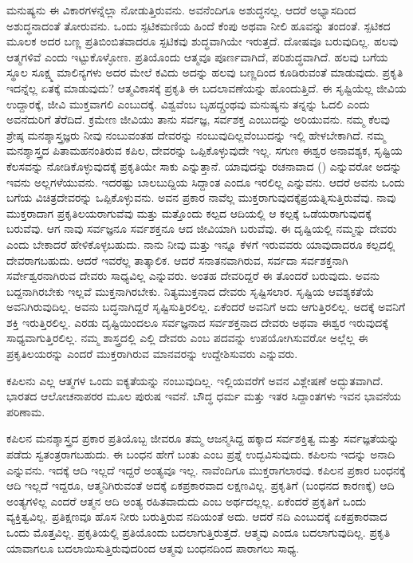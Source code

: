 ಮನುಷ್ಯನು ಈ ವಿಕಾರಗಳನ್ನೆಲ್ಲಾ ನೋಡುತ್ತಿರುವನು. ಅವನೆಂದಿಗೂ ಅಶುದ್ಧನಲ್ಲ. ಆದರೆ ಅಭ್ಯಾಸದಿಂದ ಅಶುದ್ಧನಾದಂತೆ ತೋರುವನು. ಒಂದು ಸ್ಪಟಿಕಮಣಿಯ ಹಿಂದೆ ಕೆಂಪು ಅಥವಾ ನೀಲಿ ಹೂವನ್ನು ತಂದಂತೆ. ಸ್ಪಟಿಕದ ಮೂಲಕ ಅದರ ಬಣ್ಣ ಪ್ರತಿಬಿಂಬಿತವಾದರೂ ಸ್ಪಟಿಕವು ಶುದ್ಧವಾಗಿಯೇ ಇರುತ್ತದೆ. ದೋಷವೂ ಬರುವುದಿಲ್ಲ. ಹಲವು ಆತ್ಮಗಳಿವೆ ಎಂದು ಇಟ್ಟುಕೊಳ್ಳೋಣ. ಪ್ರತಿಯೊಂದು ಆತ್ಮವೂ ಪೂರ್ಣವಾಗಿದೆ, ಪರಿಶುದ್ಧವಾಗಿದೆ. ಹಲವು ಬಗೆಯ ಸ್ಥೂಲ ಸೂಕ್ಷ್ಮ ಮಾಲಿನ್ಯಗಳು ಅದರ ಮೇಲೆ ಕವಿದು ಅದನ್ನು ಹಲವು ಬಣ್ಣದಿಂದ ಕೂಡಿರುವಂತೆ ಮಾಡುವುದು. ಪ್ರಕೃತಿ ಇದನ್ನೆಲ್ಲ ಏತಕ್ಕೆ ಮಾಡುವುದು? ಆತ್ಮವಿಕಾಸಕ್ಕೆ ಪ್ರಕೃತಿ ಈ ಬದಲಾವಣೆಯನ್ನು ಹೊಂದುತ್ತಿದೆ. ಈ ಸೃಷ್ಟಿಯೆಲ್ಲ ಜೀವಿಯ ಉದ್ದಾರಕ್ಕೆ, ಜೀವಿ ಮುಕ್ತವಾಗಲಿ ಎಂಬುದಕ್ಕೆ. ವಿಶ್ವವೆಂಬ ಬೃಹದ್ಗ್ರಂಥವು ಮನುಷ್ಯನು ತನ್ನನ್ನು ಓದಲಿ ಎಂದು ಅವನೆದುರಿಗೆ ತೆರೆದಿದೆ. ಕ್ರಮೇಣ ಜೀವಿಯು ತಾನು ಸರ್ವಜ್ಞ, ಸರ್ವಶಕ್ತ ಎಂಬುದನ್ನು ಅರಿಯುವನು. ನಮ್ಮ ಕೆಲವು ಶ್ರೇಷ್ಠ ಮನಶ್ಶಾಸ್ತ್ರಜ್ಞರು ನೀವು ನಂಬುವಂತಹ ದೇವರನ್ನು ನಂಬುವುದಿಲ್ಲವೆಂಬುದನ್ನು ಇಲ್ಲಿ ಹೇಳಬೇಕಾಗಿದೆ. ನಮ್ಮ ಮನಶ್ಶಾಸ್ತ್ರದ ಪಿತಾಮಹನಂತಿರುವ ಕಪಿಲ, ದೇವರನ್ನು ಒಪ್ಪಿಕೊಳ್ಳುವುದೇ ಇಲ್ಲ. ಸಗುಣ ಈಶ್ವರ ಅನಾವಶ್ಯಕ, ಸೃಷ್ಟಿಯ ಕೆಲಸವನ್ನು ನೋಡಿಕೊಳ್ಳುವುದಕ್ಕೆ ಪ್ರಕೃತಿಯೇ ಸಾಕು ಎನ್ನುತ್ತಾನೆ. ಯಾವುದನ್ನು ರಚನಾವಾದ () ಎನ್ನುವರೋ ಅದನ್ನು ಇವನು ಅಲ್ಲಗಳೆಯುವನು. ಇದರಷ್ಟು ಬಾಲಬುದ್ದಿಯ ಸಿದ್ದಾಂತ ಎಂದೂ ಇರಲಿಲ್ಲ ಎನ್ನುವನು. ಆದರೆ ಅವನು ಒಂದು ಬಗೆಯ ವಿಚಿತ್ರ\break ದೇವರನ್ನು ಒಪ್ಪಿಕೊಳ್ಳುವನು. ಅವನ ಪ್ರಕಾರ ನಾವೆಲ್ಲ ಮುಕ್ತರಾಗುವುದಕ್ಕೆ\break ಪ್ರಯತ್ನಿಸುತ್ತಿರುವೆವು. ನಾವು ಮುಕ್ತರಾದಾಗ ಪ್ರಕೃತಿಲಯರಾಗುವೆವು ಮತ್ತು ಮತ್ತೊಂದು ಕಲ್ಪದ ಆದಿಯಲ್ಲಿ ಆ ಕಲ್ಪಕ್ಕೆ ಒಡೆಯರಾಗುವುದಕ್ಕೆ ಬರುವೆವು. ಆಗ ನಾವು ಸರ್ವಜ್ಞನೂ ಸರ್ವಶಕ್ತನೂ ಆದ ಜೀವಿಯಾಗಿ ಬರುವೆವು. ಈ ದೃಷ್ಟಿಯಲ್ಲಿ ನಮ್ಮನ್ನು ದೇವರು ಎಂದು ಬೇಕಾದರೆ ಹೇಳಿಕೊಳ್ಳಬಹುದು. ನಾನು ನೀವು ಮತ್ತು ಇನ್ನೂ ಕೆಳಗೆ ಇರುವವರು ಯಾವುದಾದರೂ ಕಲ್ಪದಲ್ಲಿ ದೇವರಾಗಬಹುದು. ಆದರೆ ಇವರೆಲ್ಲ ತಾತ್ಕಾಲಿಕ. ಆದರೆ ಸನಾತನವಾಗಿರುವ, ಸರ್ವದಾ ಸರ್ವಶಕ್ತನಾಗಿ ಸರ್ವೇಶ್ವರನಾಗಿರುವ ದೇವರು ಸಾಧ್ಯವಿಲ್ಲ ಎನ್ನುವರು. ಅಂತಹ ದೇವರಿದ್ದರೆ ಈ ತೊಂದರೆ ಬರುವುದು. ಅವನು ಬದ್ದನಾಗಿರಬೇಕು ಇಲ್ಲವೆ ಮುಕ್ತನಾಗಿರಬೇಕು. ನಿತ್ಯಮುಕ್ತನಾದ ದೇವರು ಸೃಷ್ಟಿಸಲಾರ. ಸೃಷ್ಟಿಯ ಆವಶ್ಯಕತೆಯೆ ಅವನಿಗಿರುವುದಿಲ್ಲ. ಅವನು ಬದ್ಧನಾಗಿದ್ದರೆ ಸೃಷ್ಟಿಸುತ್ತಿರಲಿಲ್ಲ. ಏಕೆಂದರೆ ಅವನಿಗೆ ಅದು ಆಗುತ್ತಿರಲಿಲ್ಲ. ಅದಕ್ಕೆ ಅವನಿಗೆ ಶಕ್ತಿ ಇರುತ್ತಿರಲಿಲ್ಲ. ಎರಡು ದೃಷ್ಟಿಯಿಂದಲೂ ಸರ್ವಜ್ಞನಾದ ಸರ್ವಶಕ್ತನಾದ ದೇವರು ಅಥವಾ ಈಶ್ವರ ಇರುವುದಕ್ಕೆ ಸಾಧ್ಯವಾಗುತ್ತಿರಲಿಲ್ಲ. ನಮ್ಮ ಶಾಸ್ತ್ರದಲ್ಲಿ ಎಲ್ಲಿ ದೇವರು ಎಂಬ ಪದವನ್ನು ಉಪಯೋಗಿಸುವರೋ ಅಲ್ಲೆಲ್ಲ ಈ ಪ್ರಕೃತಿಲಯರನ್ನು ಎಂದರೆ ಮುಕ್ತರಾಗಿರುವ ಮಾನವರನ್ನು ಉದ್ದೇಶಿಸುವರು ಎನ್ನುವರು.

\vskip 6pt

ಕಪಿಲನು ಎಲ್ಲ ಆತ್ಮಗಳ ಒಂದು ಐಕ್ಯತೆಯನ್ನು ನಂಬುವುದಿಲ್ಲ. ಇಲ್ಲಿಯವರೆಗೆ ಅವನ ವಿಶ್ಲೇಷಣೆ ಅದ್ಭುತವಾಗಿದೆ. ಭಾರತದ ಆಲೋಚನಾಪರರ ಮೂಲ ಪುರುಷ ಇವನೆ. ಬೌದ್ಧ ಧರ್ಮ ಮತ್ತು ಇತರ ಸಿದ್ದಾಂತಗಳು ಇವನ ಭಾವನೆಯ ಪರಿಣಾಮ.

\vskip 6pt

ಕಪಿಲನ ಮನಶ್ಶಾಸ್ತ್ರದ ಪ್ರಕಾರ ಪ್ರತಿಯೊಬ್ಬ ಜೀವರೂ ತಮ್ಮ ಆಜನ್ಮಸಿದ್ದ ಹಕ್ಕಾದ ಸರ್ವಶಕ್ತಿತ್ವ ಮತ್ತು ಸರ್ವಜ್ಞತೆಯನ್ನು ಪಡೆದು ಸ್ವತಂತ್ರರಾಗಬಹುದು. ಈ ಬಂಧನ ಹೇಗೆ ಬಂತು ಎಂಬ ಪ್ರಶ್ನೆ ಉದ್ಭವಿಸುವುದು. ಕಪಿಲನು ಇದನ್ನು ಅನಾದಿ ಎನ್ನುವನು. ಇದಕ್ಕೆ ಆದಿ ಇಲ್ಲದೆ ಇದ್ದರೆ ಅಂತ್ಯವೂ ಇಲ್ಲ. ನಾವೆಂದಿಗೂ ಮುಕ್ತರಾಗಲಾರವು. ಕಪಿಲನ ಪ್ರಕಾರ ಬಂಧನಕ್ಕೆ ಆದಿ ಇಲ್ಲದೆ ಇದ್ದರೂ, ಆತ್ಮನಿಗಿರುವಂತೆ ಅದಕ್ಕೆ ಏಕಪ್ರಕಾರವಾದ ಲಕ್ಷಣವಿಲ್ಲ. ಪ್ರಕೃತಿಗೆ (ಬಂಧನದ ಕಾರಣಕ್ಕೆ) ಆದಿ ಅಂತ್ಯಗಳಿಲ್ಲ ಎಂದರೆ ಆತ್ಮನ ಆದಿ ಅಂತ್ಯ ರಹಿತವಾದುದು ಎಂಬ ಅರ್ಥದಲ್ಲಲ್ಲ. ಏಕೆಂದರೆ ಪ್ರಕೃತಿಗೆ ಒಂದು ವ್ಯಕ್ತಿತ್ವವಿಲ್ಲ. ಪ್ರತಿಕ್ಷಣವೂ ಹೊಸ ನೀರು ಬರುತ್ತಿರುವ ನದಿಯಂತೆ ಅದು. ಆದರೆ ನದಿ ಎಂಬುದಕ್ಕೆ ಏಕಪ್ರಕಾರವಾದ ಒಂದು ಮೊತ್ತವಿಲ್ಲ. ಪ್ರಕೃತಿಯಲ್ಲಿ ಪ್ರತಿಯೊಂದು ಬದಲಾಗುತ್ತಿರುತ್ತದೆ. ಆತ್ಮವು ಎಂದೂ ಬದಲಾಗುವುದಿಲ್ಲ. ಪ್ರಕೃತಿ ಯಾವಾಗಲೂ ಬದಲಾಯಿಸುತ್ತಿರುವುದರಿಂದ ಆತ್ಮವು ಬಂಧನದಿಂದ ಪಾರಾಗಲು ಸಾಧ್ಯ.

